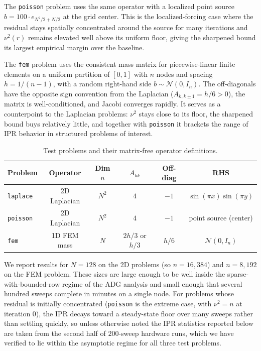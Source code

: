 \documentclass[pdflatex,sn-mathphys-num]{sn-jnl}%
\theoremstyle{thmstyleone}%
\theoremstyle{thmstyletwo}%
\theoremstyle{thmstylethree}%
\begin{document}
The \texttt{poisson} problem uses the same operator with a localized
point source $b = 100 \cdot e_{N^2/2 + N/2}$ at the grid center. This
is the localized-forcing case where the residual stays spatially
concentrated around the source for many iterations and $\nu^2(r)$
remains elevated well above its uniform floor, giving the sharpened
bound its largest empirical margin over the baseline.

The \texttt{fem} problem uses the consistent mass matrix for
piecewise-linear finite elements on a uniform partition of $[0,1]$
with $n$ nodes and spacing $h = 1/(n-1)$, with a random right-hand
side $b \sim \mathcal{N}(0, I_n)$. The off-diagonals have the opposite
sign convention from the Laplacian ($A_{k,k\pm 1} = h/6 > 0$), the
matrix is well-conditioned, and Jacobi converges rapidly. It serves as
a counterpoint to the Laplacian problems: $\nu^2$ stays close to its
floor, the sharpened bound buys relatively little, and together with
\texttt{poisson} it brackets the range of IPR behavior in structured
problems of interest.

\begin{table}[ht]
\centering
\setlength{\tabcolsep}{3pt}
\begin{tabular}{lccccc}
\hline
Problem        & Operator        & Dim $n$ & $A_{kk}$        & Off-diag         & RHS \\
\hline
\texttt{laplace} & 2D Laplacian   & $N^2$         & $4$             & $-1$             & $\sin(\pi x)\sin(\pi y)$ \\
\texttt{poisson} & 2D Laplacian   & $N^2$         & $4$             & $-1$             & point source (center) \\
\texttt{fem}     & 1D FEM mass    & $N$           & $2h/3$ or $h/3$ & $h/6$            & $\mathcal{N}(0, I_n)$ \\
\hline
\end{tabular}
\caption{Test problems and their matrix-free operator definitions.}
\label{tab:problems}
\end{table}

We report results for $N = 128$ on the 2D problems (so $n = 16{,}384$) and
$n = 8{,}192$ on the FEM problem. These sizes are large enough to be well
inside the sparse-with-bounded-row regime of the ADG analysis and small
enough that several hundred sweeps complete in minutes on a single node.
For problems whose residual is initially concentrated (\texttt{poisson} is
the extreme case, with $\nu^2 = n$ at iteration $0$), the IPR decays
toward a steady-state floor over many sweeps rather than settling quickly,
so unless otherwise noted the IPR statistics reported below are taken
from the second half of $200$-sweep hardware runs, which we have verified
to lie within the asymptotic regime for all three test problems.
\end{document}

